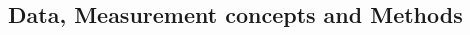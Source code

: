 \documentclass[twoside]{article}\usepackage[]{graphicx}\usepackage[]{color}
\begin{document}
\begin{multicols}{2}












\section{Data, Measurement concepts and Methods}



\end{multicols}
\end{document}
